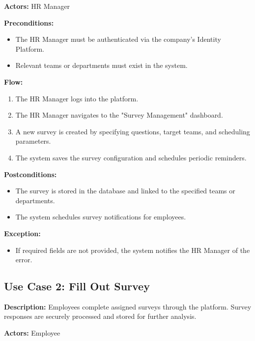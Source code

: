 \documentclass[conference]{IEEEtran}
\begin{document}
        \textbf{Actors:} HR Manager
        
        \textbf{Preconditions:}
        \begin{itemize}
            \item The HR Manager must be authenticated via the company's Identity Platform.
            \item Relevant teams or departments must exist in the system.
        \end{itemize}
        
        \textbf{Flow:}
        \begin{enumerate}
            \item The HR Manager logs into the platform.
            \item The HR Manager navigates to the "Survey Management" dashboard.
            \item A new survey is created by specifying questions, target teams, and scheduling parameters.
            \item The system saves the survey configuration and schedules periodic reminders.
        \end{enumerate}
        
        \textbf{Postconditions:}
        \begin{itemize}
            \item The survey is stored in the database and linked to the specified teams or departments.
            \item The system schedules survey notifications for employees.
        \end{itemize}
        
        \textbf{Exception:}
        \begin{itemize}
            \item If required fields are not provided, the system notifies the HR Manager of the error.
        \end{itemize}
        
        \subsection{Use Case 2: Fill Out Survey}
        
        \textbf{Description:} Employees complete assigned surveys through the platform. Survey responses are securely processed and stored for further analysis.
        
        \textbf{Actors:} Employee
        
\end{document}
